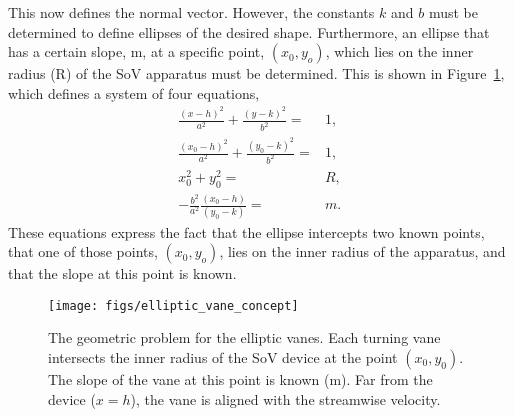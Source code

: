 This now defines the normal vector.
However, the constants $k$ and $b$ must be determined to 
define ellipses of the desired shape. 
Furthermore, an ellipse that has a certain slope, m, 
at a specific point,  $(x_0,y_o)$, which lies on the inner
radius (R) of the SoV apparatus must be determined. This is shown in
Figure~\ref{fig:elliptic_vane_concept}, which defines a system of four
equations,
\begin{eqnarray}
 \frac{(x-h)^2}{a^2} + \frac{(y-k)^2}{b^2} =& 1, \label{eq:ell1}\\
 \frac{(x_0-h)^2}{a^2} + \frac{(y_0-k)^2}{b^2} =& 1, \label{eq:ell2}  \\
 x_0^2 + y_0^2 =& R, \label{eq:ell3} \\
 -\frac{b^2}{a^2}\frac{(x_0-h)}{(y_0-k)} =& m. \label{eq:ell4} 
\end{eqnarray}
These equations express the fact that the ellipse intercepts two known
points, that one of those points, $(x_0,y_o)$, lies 
on the inner radius of the apparatus, and that the slope at 
this point is known. 



 \begin{figure}[!htb]
  \begin{center}
   \texttt{[image: figs/elliptic\_vane\_concept]}
   \caption{The geometric problem for the elliptic vanes. Each turning vane intersects
   the inner radius of the SoV device at the point $(x_0,y_0)$. 
   The slope of the vane at this point is known (m). 
   Far from the device ($x=h$), the vane is aligned with the streamwise velocity. }
   \label{fig:elliptic_vane_concept}
  \end{center}
 \end{figure}

